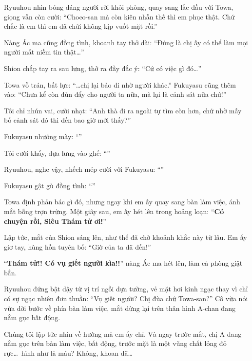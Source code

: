 \documentclass[../main.tex]{subfiles}
\begin{document}
Ryuuhou nhìn bóng dáng người rời khỏi phòng, quay sang lắc đầu với Towa, giọng vẫn còn cười: ``Choco-san mà còn kiên nhẫn thế thì em phục thật. Chứ chắc là em thì em đã chửi không kịp vuốt mặt rồi.''

Nàng Ác ma cũng đồng tình, khoanh tay thở dài: ``Đúng là chị ấy có thể làm mọi người mất niềm tin thật\dots''

Shion chắp tay ra sau lưng, thở ra đầy đắc ý: ``Cứ có việc gì đó\dots''

Towa vỗ trán, bất lực: ``\dots chị lại bảo đi nhờ người khác.'' Fukuyasu cũng thêm vào: ``Chưa kể còn đùn đẩy cho người ta nữa, mà lại là cảnh sát nữa chứ!''

Tôi chỉ nhún vai, cười nhạt: ``Anh thà đi ra ngoài tự tìm còn hơn, chứ nhờ mấy bố cảnh sát đó thì đến bao giờ mới thấy?''

Fukuyasu nhướng mày: ``''

Tôi cười khẩy, dựa lưng vào ghế: ``''

Ryuuhou, nghe vậy, nhếch mép cười với Fukuyasu: ``''

Fukuyasu gật gù đồng tình: ``''

Towa định phản bác gì đó, nhưng ngay khi em ấy quay sang bàn làm việc, ánh mắt bỗng trợn trừng. Một giây sau, em ấy hét lên trong hoảng loạn: ``\textbf{Có chuyện rồi, Siêu Thám tử ơi!}''

Lập tức, mắt của Shion sáng lên, như thể đã chờ khoảnh khắc này từ lâu. Em ấy giơ tay, hùng hồn tuyên bố: ``Giờ của ta đã đến!''

``\textbf{Thám tử!! Có vụ giết người kìa!!}'' nàng Ác ma hét lên, làm cả phòng giật bắn.

Ryuuhou đứng bật dậy từ vị trí ngồi dựa tường, vẻ mặt hơi kinh ngạc thay vì chỉ có sự ngạc nhiên đơn thuần: ``Vụ giết người? Chị đùa chứ Towa-san?'' Cô vừa nói vừa dời bước về phía bàn làm việc, mắt dừng lại trên thân hình A-chan đang nằm gục bất động.

Chúng tôi lập tức nhìn về hướng mà em ấy chỉ. Và ngay trước mắt, chị A đang nằm gục trên bàn làm việc, bất động, trước mặt là một vũng chất lỏng đỏ rực\dots\ hình như là máu? Không, khoan đã\dots
\end{document}
